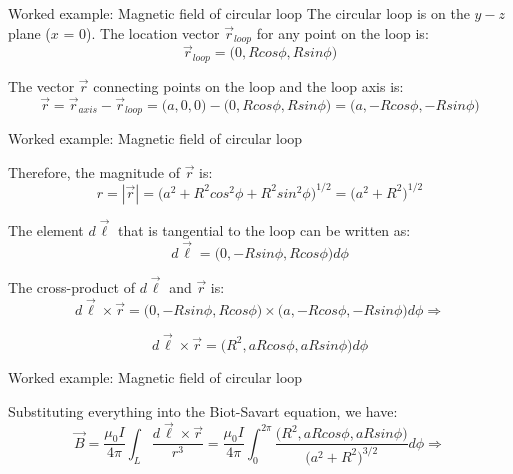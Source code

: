 {\begin{frame}{Worked example: Magnetic field of circular loop}
  The circular loop is on the $y-z$ plane ($x$ = 0).
  The location vector $\vec{r}_{loop}$
  for any point on the loop is:
  \begin{equation*}
     \vec{r}_{loop} = \Big(0, R cos\phi, R sin\phi \Big)
  \end{equation*}

  The vector $\vec{r}$ connecting points on the loop
  and the loop axis is:
  \begin{equation*}
      \vec{r} = \vec{r}_{axis} - \vec{r}_{loop} =
      \Big(a, 0, 0\Big) - \Big(0, R cos\phi, R sin\phi \Big) =
      \Big(a, -R cos\phi, -R sin\phi \Big)
  \end{equation*}

\end{frame}

%
%
%

\begin{frame}{Worked example: Magnetic field of circular loop}

  Therefore, the magnitude of $\vec{r}$ is:
  \begin{equation*}
      r = |\vec{r}| = \Big(a^2 + R^2 cos^{2}\phi + R^2 sin^{2}\phi \Big)^{1/2} =  \Big(a^2 + R^2 \Big)^{1/2}
  \end{equation*}

  The element $d\vec{\ell}$ that is
  tangential to the loop can be written as:
  \begin{equation*}
          d\vec{\ell} = \Big(0, - R sin\phi, R cos\phi \Big) d\phi
  \end{equation*}

  The cross-product of $d\vec{\ell}$ and  $\vec{r}$ is:
  \begin{equation*}
      d\vec{\ell} \times \vec{r} =
      \Big(0, - R sin\phi, R cos\phi \Big) \times
      \Big(a, -R cos\phi, -R sin\phi \Big)  d\phi \Rightarrow
  \end{equation*}

  \begin{equation*}
      d\vec{\ell} \times \vec{r} =
      \Big(R^2, a R cos\phi, a R sin\phi \Big) d\phi
  \end{equation*}

\end{frame}

%
%
%

\begin{frame}{Worked example: Magnetic field of circular loop}

  Substituting everything into the Biot-Savart equation, we have:
  \begin{equation*}
     \vec{B} = \frac{\mu_0 I}{4\pi}
        \int_{L} \frac{d\vec{\ell} \times \vec{r}}{r^3}
             = \frac{\mu_0 I}{4\pi}
        \int_{0}^{2\pi}
        \frac{\Big(R^2, a R cos\phi, a R sin\phi \Big)}{\Big(a^2 + R^2 \Big)^{3/2}} d\phi
        \Rightarrow
  \end{equation*}


\end{frame}}

